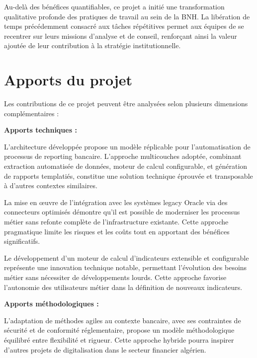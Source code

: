 \medskip

Au-delà des bénéfices quantifiables, ce projet a initié une transformation qualitative profonde des pratiques de travail au sein de la BNH. La libération de temps précédemment consacré aux tâches répétitives permet aux équipes de se recentrer sur leurs missions d'analyse et de conseil, renforçant ainsi la valeur ajoutée de leur contribution à la stratégie institutionnelle.

\section*{Apports du projet}

Les contributions de ce projet peuvent être analysées selon plusieurs dimensions complémentaires :

\medskip

\textbf{Apports techniques :}

L'architecture développée propose un modèle réplicable pour l'automatisation de processus de reporting bancaire. L'approche multicouches adoptée, combinant extraction automatisée de données, moteur de calcul configurable, et génération de rapports templatiés, constitue une solution technique éprouvée et transposable à d'autres contextes similaires.

\medskip

La mise en œuvre de l'intégration avec les systèmes legacy Oracle via des connecteurs optimisés démontre qu'il est possible de moderniser les processus métier sans refonte complète de l'infrastructure existante. Cette approche pragmatique limite les risques et les coûts tout en apportant des bénéfices significatifs.

\medskip

Le développement d'un moteur de calcul d'indicateurs extensible et configurable représente une innovation technique notable, permettant l'évolution des besoins métier sans nécessiter de développements lourds. Cette approche favorise l'autonomie des utilisateurs métier dans la définition de nouveaux indicateurs.

\medskip

\textbf{Apports méthodologiques :}

L'adaptation de méthodes agiles au contexte bancaire, avec ses contraintes de sécurité et de conformité réglementaire, propose un modèle méthodologique équilibré entre flexibilité et rigueur. Cette approche hybride pourra inspirer d'autres projets de digitalisation dans le secteur financier algérien.

